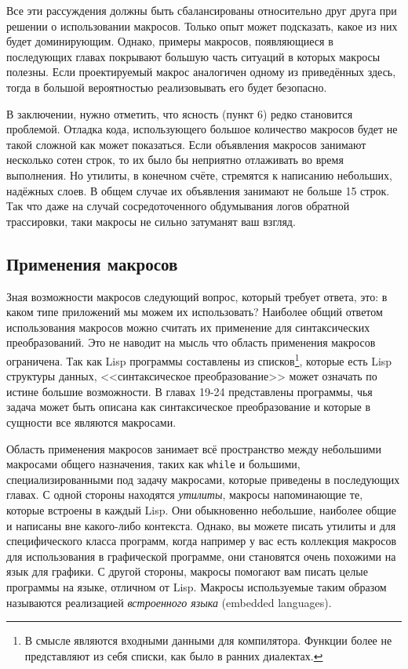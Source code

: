 \documentclass[12pt, a4paper]{article} %
\begin{document}
Все эти рассуждения должны быть сбалансированы относительно друг друга при решении о использовании макросов. Только опыт может подсказать, какое из них будет доминирующим. Однако, примеры макросов, появляющиеся в последующих главах покрывают большую часть ситуаций в которых макросы полезны. Если проектируемый макрос аналогичен одному из приведённых здесь, тогда в большой вероятностью реализовывать его будет безопасно.

В заключении, нужно отметить, что ясность (пункт 6) редко становится проблемой. Отладка кода, использующего большое количество макросов будет не такой сложной как может показаться. Если объявления макросов занимают несколько сотен строк, то их было бы неприятно отлаживать во время выполнения. Но утилиты, в конечном счёте, стремятся к написанию небольших, надёжных слоев. В общем случае их объявления занимают не больше 15 строк. Так что даже на случай сосредоточенного обдумывания логов обратной трассировки, таки макросы не сильно затуманят ваш взгляд.


\subsection{Применения макросов}

Зная возможности макросов следующий вопрос, который требует ответа, это: в каком типе приложений мы можем их использовать? Наиболее общий ответом использования макросов можно считать их применение для синтаксических преобразований. Это не наводит на мысль что область применения макросов ограничена. Так как Lisp программы составлены из списков\footnote{В смысле являются входными данными для компилятора. Функции более не представляют из себя списки, как было в ранних диалектах. }, которые есть Lisp структуры данных, <<синтаксическое преобразование>> может означать по истине большие возможности. В главах 19-24 представлены программы, чья задача может быть описана как синтаксическое преобразование и которые в сущности все являются макросами.

Область применения макросов занимает всё пространство между небольшими макросами общего назначения, таких как \texttt{while} и большими, специализированными под задачу макросами, которые приведены в последующих главах. С одной стороны находятся \textit{утилиты}, макросы напоминающие те, которые встроены в каждый Lisp. Они обыкновенно небольшие, наиболее общие и написаны вне какого-либо контекста. Однако, вы можете писать утилиты и для специфического класса программ, когда например у вас есть коллекция макросов для использования в графической программе, они становятся очень похожими на язык для графики. С другой стороны, макросы помогают вам писать целые программы на языке, отличном от Lisp. Макросы используемые таким образом называются реализацией \textit{встроенного языка} (embedded languages).
\end{document}
